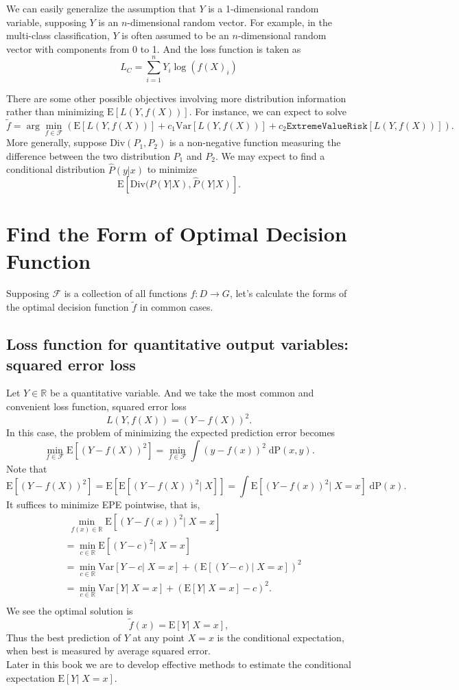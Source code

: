 \documentclass{report}
\theoremstyle{nonumberplain}
\newcommand{\0}{\mathbf{0}}
\begin{document}
We can easily generalize the assumption that $Y$ is a 1-dimensional random variable, supposing $Y$ is an $n$-dimensional random vector. For example, in the multi-class classification, $Y$ is often assumed to be an $n$-dimensional random vector with components from 0 to 1. And the loss function is taken as
\[
L_C=\sum_{i=1}^{n}Y_i\log (f(X)_i)
\]
 
There are some other possible objectives involving more distribution information rather than minimizing $\mathrm{E}[L(Y,f(X))]$. For instance, we can expect to solve
\[
\tilde{f}=\arg\min_{f\in\mathcal{F}}\left(\mathrm{E}[L(Y,f(X))]+c_1\mathrm{Var}[L(Y,f(X))]+c_2 \mathtt{Extreme Value Risk}[L(Y,f(X))]\right).
\]
More generally, suppose $\mathrm{Div}(P_1,P_2)$ is a non-negative function measuring the difference between the two distribution $P_1$ and $P_2$. We may expect to find a conditional distribution $\hat{P}(y|x)$ to minimize $$\mathrm{E}[\mathrm{Div}(P(Y|X),\hat{P}(Y|X)].$$


		
	
\section{Find the Form of Optimal Decision Function }
Supposing $\mathcal{F}$ is a collection of all functions $f:D\to G$, let's calculate the forms of the optimal decision function $\tilde{f}$ in common cases.
\subsection{Loss function for quantitative output variables: squared error loss}
Let $Y\in\mathbb{R}$ be a quantitative variable. And we take the most
common and convenient loss function, squared error loss
\[
L(Y,f(X))=(Y-f(X))^2.
\]
In this case, the problem of minimizing the expected prediction error becomes
\[
\min_{f\in\mathcal{F}}\mathrm{E}[(Y-f(X))^2]=\min_{f\in\mathcal{F}}\int (y-f(x))^2\;\mathrm{dP}(x,y).
\]
Note that
\[\mathrm{E}[(Y-f(X))^2]=\mathrm{E}[\mathrm{E}[(Y-f(X))^2|\; X]]=\int\mathrm{E}[(Y-f(x))^2|\; X=x]\;\mathrm{dP}(x).\]
It suffices to minimize EPE pointwise, that is, 
\begin{align*}
&\ \ \min_{f(x)\in\mathbb{R}}\mathrm{E}[(Y-f(x))^2|\; X=x]\\
&=\min_{c\in\mathbb{R}}\mathrm{E}[(Y-c)^2|\; X=x]\\
&=\min_{c\in\mathbb{R}}\mathrm{Var}[Y-c|\; X=x]+(\mathrm{E}[(Y-c)|\; X=x])^2\\
&=\min_{c\in\mathbb{R}}\mathrm{Var}[Y|\; X=x]+(\mathrm{E}[Y|\; X=x]-c)^2.\\
\end{align*}
We see the optimal solution is
\[
\tilde{f}(x) = \mathrm{E}[Y|\; X=x],
\]
Thus the best prediction of $Y$ at any point $X = x$ is the conditional expectation, when best is measured by average squared error. \\
Later in this book we are to develop effective methods to estimate the conditional expectation $\mathrm{E}[Y|\; X=x]$.
\end{document}
